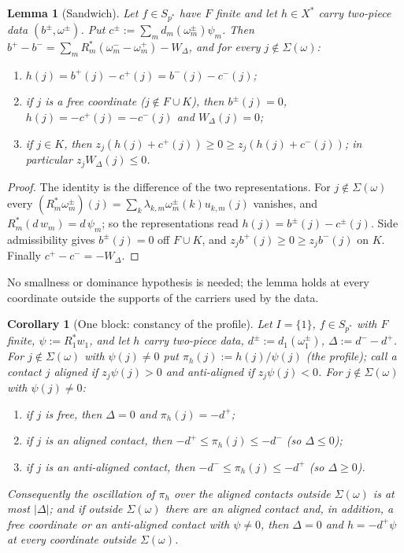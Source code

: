 \documentclass[10pt]{amsart}
\newtheorem{lemma}[theorem]{Lemma}
\newtheorem{corollary}[theorem]{Corollary}
\theoremstyle{definition}
\theoremstyle{remark}
\begin{document}
\begin{lemma}[Sandwich]\label{lem:II-sandwich}
Let $f\in S_{p^*}$ have $F$ finite and let $h\in X^*$ carry two-piece data
$(b^\pm,\omega^\pm)$.  Put $c^\pm:=\sum_md_m(\omega^\pm_m)\psi_m$.  Then
$b^+-b^-=\sum_mR_m^*(\omega^-_m-\omega^+_m)-W_\Delta$, and for every
$j\notin\Sigma(\omega)$:
\begin{enumerate}
\item[(a)] $h(j)=b^+(j)-c^+(j)=b^-(j)-c^-(j)$;
\item[(b)] if $j$ is a free coordinate \textup{(}$j\notin F\cup K$\textup{)}, then
$b^\pm(j)=0$, $h(j)=-c^+(j)=-c^-(j)$ and $W_\Delta(j)=0$;
\item[(c)] if $j\in K$, then $z_j(h(j)+c^+(j))\ge0\ge z_j(h(j)+c^-(j))$; in
particular $z_jW_\Delta(j)\le0$.
\end{enumerate}
\end{lemma}

\begin{proof}
The identity is the difference of the two representations.  For
$j\notin\Sigma(\omega)$ every $(R_m^*\omega^\pm_m)(j)=\sum_k\lambda_{k,m}
\omega^\pm_m(k)u_{k,m}(j)$ vanishes, and $R_m^*(d\,w_m)=d\,\psi_m$; so the
representations read $h(j)=b^\pm(j)-c^\pm(j)$.  Side admissibility gives
$b^\pm(j)=0$ off $F\cup K$, and $z_jb^+(j)\ge0\ge z_jb^-(j)$ on $K$.  Finally
$c^+-c^-=-W_\Delta$.
\end{proof}

No smallness or dominance hypothesis is needed; the lemma holds at every
coordinate outside the supports of the carriers used by the data.

\begin{corollary}[One block: constancy of the profile]\label{cor:II-S1}
Let $I=\{1\}$, $f\in S_{p^*}$ with $F$ finite, $\psi:=R_1^*w_1$, and let $h$
carry two-piece data, $d^\pm:=d_1(\omega^\pm_1)$, $\Delta:=d^--d^+$.  For
$j\notin\Sigma(\omega)$ with $\psi(j)\ne0$ put $\pi_h(j):=h(j)/\psi(j)$ (the
\emph{profile}); call a contact $j$ \emph{aligned} if $z_j\psi(j)>0$ and
\emph{anti-aligned} if $z_j\psi(j)<0$.  For $j\notin\Sigma(\omega)$ with
$\psi(j)\ne0$:
\begin{enumerate}
\item[(i)] if $j$ is free, then $\Delta=0$ and $\pi_h(j)=-d^+$;
\item[(ii)] if $j$ is an aligned contact, then $-d^+\le\pi_h(j)\le-d^-$
\textup{(}so $\Delta\le0$\textup{)};
\item[(iii)] if $j$ is an anti-aligned contact, then $-d^-\le\pi_h(j)\le-d^+$
\textup{(}so $\Delta\ge0$\textup{)}.
\end{enumerate}
Consequently the oscillation of $\pi_h$ over the aligned contacts outside
$\Sigma(\omega)$ is at most $|\Delta|$; and if outside $\Sigma(\omega)$ there
are an aligned contact and, in addition, a free coordinate or an
anti-aligned contact with $\psi\ne0$, then $\Delta=0$ and $h=-d^+\psi$ at
every coordinate outside $\Sigma(\omega)$.
\end{corollary}
\end{document}
